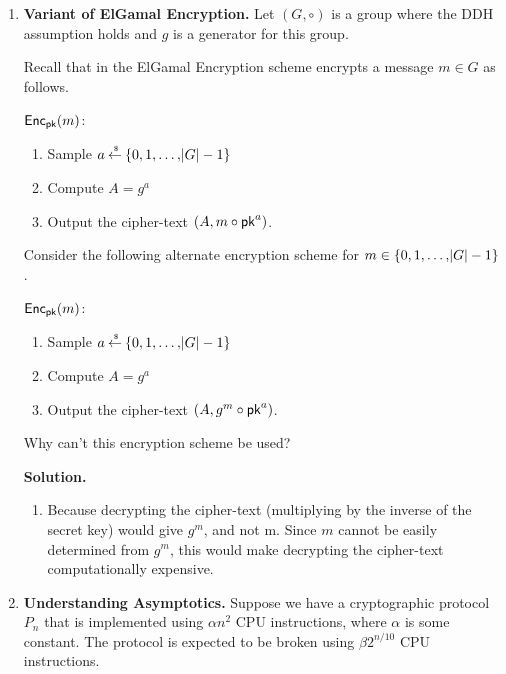 \documentclass[11pt]{article}
\newcommand{\nextoddpage}{\checkoddpage\ifoddpage{\ \newpage\ \newpage}\else{\ \newpage}\fi}
\begin{document}
\begin{enumerate}
  {\bfseries Solution.} 
  \begin{enumerate}
  \item Sol 1
  \item Sol 2 
  \end{enumerate} 
  
  
\nextoddpage 
\item {\bfseries Variant of ElGamal Encryption.} 
  Let $(G,\circ)$ is a group where the DDH assumption holds and $g$ is a generator for this group. 
  
  Recall that in the ElGamal Encryption scheme encrypts a message $m\in G$ as follows.
  \begin{boxedalgo}
  $\mathsf{Enc}_\mathsf{pk}(m)$:
  \begin{enumerate}
  \item Sample $a\mathbin{\stackrel{\mbox{\,\tiny \$}}{\gets}}\{0,1,\dots,\abs G-1\}$ 
  \item Compute $A = g^a$ 
  \item Output the cipher-text $(A, m\circ \mathsf{pk}^a)$. 
  \end{enumerate} 
  \end{boxedalgo} 
  
  Consider the following alternate encryption scheme for $m\in\{0,1,\dotsc,\abs G-1\}$.
  \begin{boxedalgo}
  $\mathsf{Enc}_\mathsf{pk}(m)$:
  \begin{enumerate}
  \item Sample $a\mathbin{\stackrel{\mbox{\,\tiny \$}}{\gets}}\{0,1,\dots,\abs G-1\}$ 
  \item Compute $A = g^a$ 
  \item Output the cipher-text $(A, g^m\circ \mathsf{pk}^a)$. 
  \end{enumerate} 
  \end{boxedalgo} 
  
  Why can't this encryption scheme be used? 
  
  {\bfseries Solution.} 
  \begin{enumerate}
  \item Because decrypting the cipher-text (multiplying by the inverse of the secret key) would give $g^m$, and not m. Since $m$ cannot be easily determined from $g^m$, this would make decrypting the cipher-text computationally expensive.
  \end{enumerate}
  
  
  
   

\nextoddpage 
\item {\bfseries Understanding Asymptotics.} 
  Suppose we have a cryptographic protocol $P_n$ that is implemented using $\alpha n^2$ CPU instructions, where $\alpha$ is some constant.  
  The protocol is expected to be broken using $\beta 2^{n/10}$ CPU instructions. 
  

\end{enumerate}
\end{document}
